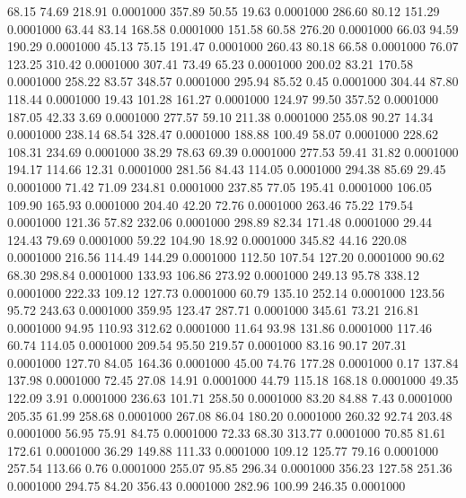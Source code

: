   68.15   74.69  218.91   0.0001000
 357.89   50.55   19.63   0.0001000
 286.60   80.12  151.29   0.0001000
  63.44   83.14  168.58   0.0001000
 151.58   60.58  276.20   0.0001000
  66.03   94.59  190.29   0.0001000
  45.13   75.15  191.47   0.0001000
 260.43   80.18   66.58   0.0001000
  76.07  123.25  310.42   0.0001000
 307.41   73.49   65.23   0.0001000
 200.02   83.21  170.58   0.0001000
 258.22   83.57  348.57   0.0001000
 295.94   85.52    0.45   0.0001000
 304.44   87.80  118.44   0.0001000
  19.43  101.28  161.27   0.0001000
 124.97   99.50  357.52   0.0001000
 187.05   42.33    3.69   0.0001000
 277.57   59.10  211.38   0.0001000
 255.08   90.27   14.34   0.0001000
 238.14   68.54  328.47   0.0001000
 188.88  100.49   58.07   0.0001000
 228.62  108.31  234.69   0.0001000
  38.29   78.63   69.39   0.0001000
 277.53   59.41   31.82   0.0001000
 194.17  114.66   12.31   0.0001000
 281.56   84.43  114.05   0.0001000
 294.38   85.69   29.45   0.0001000
  71.42   71.09  234.81   0.0001000
 237.85   77.05  195.41   0.0001000
 106.05  109.90  165.93   0.0001000
 204.40   42.20   72.76   0.0001000
 263.46   75.22  179.54   0.0001000
 121.36   57.82  232.06   0.0001000
 298.89   82.34  171.48   0.0001000
  29.44  124.43   79.69   0.0001000
  59.22  104.90   18.92   0.0001000
 345.82   44.16  220.08   0.0001000
 216.56  114.49  144.29   0.0001000
 112.50  107.54  127.20   0.0001000
  90.62   68.30  298.84   0.0001000
 133.93  106.86  273.92   0.0001000
 249.13   95.78  338.12   0.0001000
 222.33  109.12  127.73   0.0001000
  60.79  135.10  252.14   0.0001000
 123.56   95.72  243.63   0.0001000
 359.95  123.47  287.71   0.0001000
 345.61   73.21  216.81   0.0001000
  94.95  110.93  312.62   0.0001000
  11.64   93.98  131.86   0.0001000
 117.46   60.74  114.05   0.0001000
 209.54   95.50  219.57   0.0001000
  83.16   90.17  207.31   0.0001000
 127.70   84.05  164.36   0.0001000
  45.00   74.76  177.28   0.0001000
   0.17  137.84  137.98   0.0001000
  72.45   27.08   14.91   0.0001000
  44.79  115.18  168.18   0.0001000
  49.35  122.09    3.91   0.0001000
 236.63  101.71  258.50   0.0001000
  83.20   84.88    7.43   0.0001000
 205.35   61.99  258.68   0.0001000
 267.08   86.04  180.20   0.0001000
 260.32   92.74  203.48   0.0001000
  56.95   75.91   84.75   0.0001000
  72.33   68.30  313.77   0.0001000
  70.85   81.61  172.61   0.0001000
  36.29  149.88  111.33   0.0001000
 109.12  125.77   79.16   0.0001000
 257.54  113.66    0.76   0.0001000
 255.07   95.85  296.34   0.0001000
 356.23  127.58  251.36   0.0001000
 294.75   84.20  356.43   0.0001000
 282.96  100.99  246.35   0.0001000
